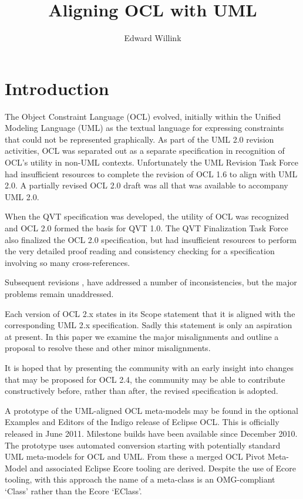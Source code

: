 \documentclass{eceasst}
\title{%
Aligning OCL with UML}
\author{%
Edward Willink\autref{1}}
\institute{%
\autlabel{1} \email{ed \_at\_ willink.me.uk}, \url{http://www.eclipse.org/modeling}\\
Eclipse Modeling Project}
\begin{document}
\maketitle
\section{Introduction}

The Object Constraint Language (OCL) evolved, initially within the Unified Modeling Language (UML) as the textual language for expressing constraints that could not be represented graphically. As part of the UML 2.0\cite{UML-2.0} revision activities, OCL was separated out as a separate specification in recognition of OCL's utility in non-UML contexts. Unfortunately the UML Revision Task Force had insufficient resources to complete the revision of OCL 1.6\cite{OCL-1.6} to align with UML 2.0. A partially revised OCL 2.0 draft\cite{OCL-2.0-draft} was all that was available to accompany UML 2.0.

When the QVT specification was developed, the utility of OCL was recognized and OCL 2.0\cite{OCL-2.0} formed the basis for QVT 1.0\cite{QVT-1.0}. The QVT Finalization Task Force also finalized the OCL 2.0 specification, but  had insufficient resources to perform the very detailed proof reading and consistency checking for a specification involving so many cross-references.

Subsequent revisions \cite{OCL-2.2},\cite{OCL-2.3} have addressed a number of  inconsistencies, but the major problems remain unaddressed.

Each version of OCL 2.x states in its Scope statement that it is aligned with the corresponding UML 2.x specification. Sadly this statement is only an aspiration at present. In this paper we examine the major misalignments and outline a proposal to resolve these and other minor misalignments.

It is hoped that by presenting the community with an early insight into changes that may be proposed for OCL 2.4, the community may be able to contribute constructively before, rather than after, the revised specification is adopted.

A prototype of the UML-aligned OCL meta-models may be found in the optional Examples and Editors of the Indigo release of Eclipse OCL\cite{MDT/OCL}. This is officially released in June 2011. Milestone builds have been available since December 2010. The prototype uses automated conversion starting with potentially standard UML meta-models for OCL and UML. From these a merged OCL Pivot Meta-Model and associated Eclipse Ecore\cite{EMF} tooling are derived. Despite the use of Ecore tooling, with this approach the name of a meta-class is an OMG-compliant `Class' rather than the Ecore `EClass'. 
\end{document}
